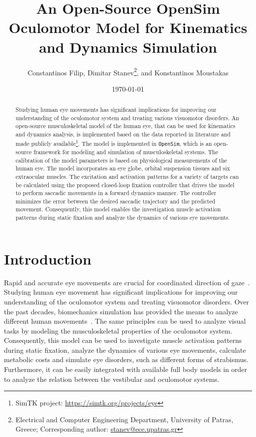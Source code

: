 \documentclass[11pt,a4paper,draft=false]{report}
\title{An Open-Source OpenSim Oculomotor Model for Kinematics and Dynamics
  Simulation}
\author{Constantinos Filip, Dimitar Stanev\footnote{Electrical and Computer
    Engineering Department, University of Patras, Greece; Corresponding
    author: \url{stanev@ece.upatras.gr}}, and Konstantinos Moustakas}
\date{\today}
\begin{document}

\maketitle

\begin{abstract}
  Studying human eye movements has significant implications for improving our
  understanding of the oculomotor system and treating various visuomotor
  disorders. An open-source musculoskeletal model of the human eye, that can be
  used for kinematics and dynamics analysis, is implemented based on the data
  reported in literature and made publicly available\footnote{SimTK project:
    \url{https://simtk.org/projects/eye}}. The model is implemented in
  \texttt{OpenSim}, which is an open-source framework for modeling and
  simulation of musculoskeletal systems. The calibration of the model parameters
  is based on physiological measurements of the human eye. The model
  incorporates an eye globe, orbital suspension tissues and six extraocular
  muscles. The excitation and activation patterns for a variety of targets can
  be calculated using the proposed closed-loop fixation controller that drives
  the model to perform saccadic movements in a forward dynamics manner. The
  controller minimizes the error between the desired saccadic trajectory and the
  predicted movement. Consequently, this model enables the investigation muscle
  activation patterns during static fixation and analyze the dynamics of various
  eye movements.
\end{abstract}

\section*{Introduction}\label{sec:introduction}

Rapid and accurate eye movements are crucial for coordinated direction of
gaze~\cite{Lee2006}. Studying human eye movement has significant implications
for improving our understanding of the oculomotor system and treating visuomotor
disorders. Over the past decades, biomechanics simulation has provided the means
to analyze different human movements~\cite{Delp2007}. The same principles can be
used to analyze visual tasks by modeling the musculoskeletal properties of the
oculomotor system. Consequently, this model can be used to investigate muscle
activation patterns during static fixation, analyze the dynamics of various eye
movements, calculate metabolic costs and simulate eye disorders, such as
different forms of strabismus. Furthermore, it can be easily integrated with
available full body models in order to analyze the relation between the
vestibular and oculomotor systems.
\end{document}
